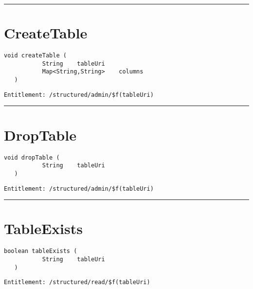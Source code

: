\rule{12cm}{2pt}
\section{CreateTable}
\label{Api:CreateTable}
\begin{lstlisting}[style=nonumbers]
   void createTable (
           String    tableUri
           Map<String,String>    columns
   )
\end{lstlisting}
\begin{Verbatim}[formatcom=\color{Maroon}]
  Entitlement: /structured/admin/$f(tableUri)
\end{Verbatim}



\rule{12cm}{2pt}
\section{DropTable}
\label{Api:DropTable}
\begin{lstlisting}[style=nonumbers]
   void dropTable (
           String    tableUri
   )
\end{lstlisting}
\begin{Verbatim}[formatcom=\color{Maroon}]
  Entitlement: /structured/admin/$f(tableUri)
\end{Verbatim}



\rule{12cm}{2pt}
\section{TableExists}
\label{Api:TableExists}
\begin{lstlisting}[style=nonumbers]
   boolean tableExists (
           String    tableUri
   )
\end{lstlisting}
\begin{Verbatim}[formatcom=\color{Maroon}]
  Entitlement: /structured/read/$f(tableUri)
\end{Verbatim}




